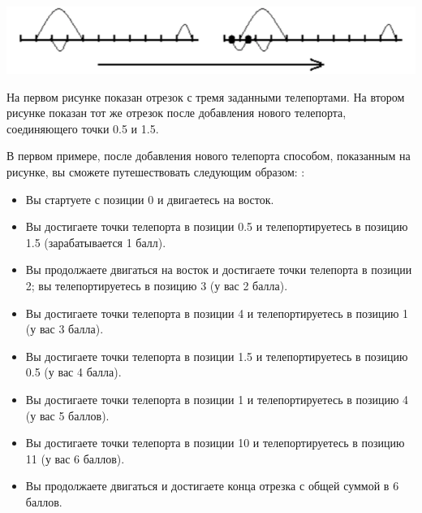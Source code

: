 \includegraphics[scale=0.8]{teleport.png}

На первом рисунке показан отрезок с тремя заданными телепортами. На втором рисунке показан тот же отрезок после добавления
нового телепорта, соединяющего точки 0.5 и 1.5.

В первом примере, после добавления нового телепорта способом, показанным на рисунке, вы сможете путешествовать следующим образом: :
\begin{itemize}
\item Вы стартуете с позиции 0 и двигаетесь на восток. 
\item Вы достигаете точки телепорта в позиции 0.5 и телепортируетесь в позицию 1.5
(зарабатывается 1 балл). 
\item Вы продолжаете двигаться на восток и достигаете точки телепорта в позиции 2; вы
телепортируетесь в позицию 3 (у вас 2 балла). 
\item Вы достигаете точки телепорта в позиции 4 и телепортируетесь в позицию 1 (у вас 3 балла). 
\item Вы достигаете точки телепорта в позиции 1.5 и телепортируетесь в позицию 0.5 (у вас 4
балла). 
\item Вы достигаете точки телепорта в позиции 1 и телепортируетесь в позицию 4 (у вас 5 баллов). 
\item Вы достигаете точки телепорта в позиции 10 и телепортируетесь в позицию 11 (у вас 6
баллов). 
\item Вы продолжаете двигаться и достигаете конца отрезка с общей суммой в 6 баллов. 
\end{itemize}